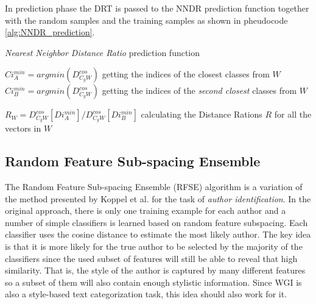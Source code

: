 \documentclass[runningheads]{llncs}
\begin{document}
In prediction phase the DRT is passed to the NNDR prediction function together with the random samples and the training samples as shown in pheudocode \ref{alg:NNDR_prediction}.

\begin{algorithm}[H]
\caption{\textit{Nearest Neighbor Distance Ratio} prediction function}\label{alg:NNDR_prediction}


$Ci^{min}_{A} = argmin(D^{cos}_{C_{g}W})$ getting the indices of the closest classes from $W$\;
$Ci^{min}_{B} = argmin(D^{cos}_{C_{g}W})$ getting the indices of the \textit{second closest} classes from $W$\;

$R_{W} = D^{cos}_{C_{g}W}[Di^{min}_{A}] / D^{cos}_{C_{g}W}[Di^{min}_{B}]$ calculating the Distance Rations $R$ for all the vectors in $W$


\end{algorithm}


\subsection{Random Feature Sub-spacing Ensemble}\label{sec:RFSE_Description}

The Random Feature Sub-spacing Ensemble (RFSE) algorithm is a variation of the method presented by Koppel et al. \citep{koppel2011authorship} for the task of \textit{author identification}. In the original approach, there is only one training example for each author and a number of simple classifiers is learned based on random feature subspacing. Each classifier uses the cosine distance to estimate the most likely author. The key idea is that it is more likely for the true author to be selected by the majority of the classifiers since the used subset of features will still be able to reveal that high similarity. That is, the style of the author is captured by many different features so a subset of them will also contain enough stylistic information. Since WGI is also a style-based text categorization task, this idea should also work for it.
\end{document}
